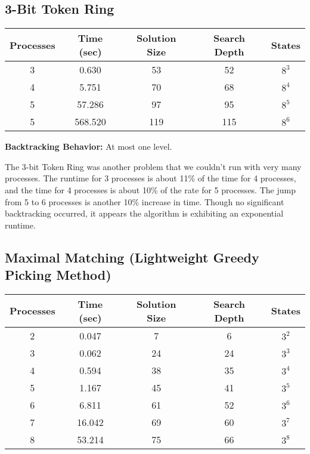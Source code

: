\subsection{3-Bit Token Ring}
\begin{center}
\begin{tabular}{|c|c|c|c|c|}
\hline
 Processes & Time (sec) & Solution Size & Search Depth & States \\
\hline         
 3 & 0.630 & 53 & 52 & $8^{3}$       \\
 4 & 5.751 & 70 & 68 & $8^{4}$      \\
 5 & 57.286 & 97 & 95 & $8^{5}$      \\
 5 & 568.520 & 119 & 115 & $8^{6}$      \\
\hline
\end{tabular}
\end{center}

{\bf Backtracking Behavior:} At most one level.

The 3-bit Token Ring was another problem that we couldn't run with very many processes. 
The runtime for 3 processes is about 11\% of the time for 4 processes, and the time for 4 processes is about 10\% of the rate for 5 processes.
The jump from 5 to 6 processes is another 10\% increase in time.
Though no significant backtracking occurred, it appears the algorithm is exhibiting an exponential runtime.

\subsection{Maximal Matching (Lightweight Greedy Picking Method)}
\begin{center}
\begin{tabular}{|c|c|c|c|c|}
\hline
 Processes & Time (sec) & Solution Size & Search Depth & States \\
\hline         
 2 & 0.047 & 7 & 6 & $3^{2}$        \\
 3 & 0.062 & 24 & 24 & $3^{3}$       \\
 4 & 0.594 & 38 & 35 & $3^{4}$      \\
 5 & 1.167 & 45 & 41 & $3^{5}$      \\
 6 & 6.811 & 61 & 52 & $3^{6}$     \\
 7 & 16.042 & 69 & 60 & $3^{7}$    \\
 8 & 53.214 & 75 & 66 & $3^{8}$    \\
\hline
\end{tabular}
\end{center}

